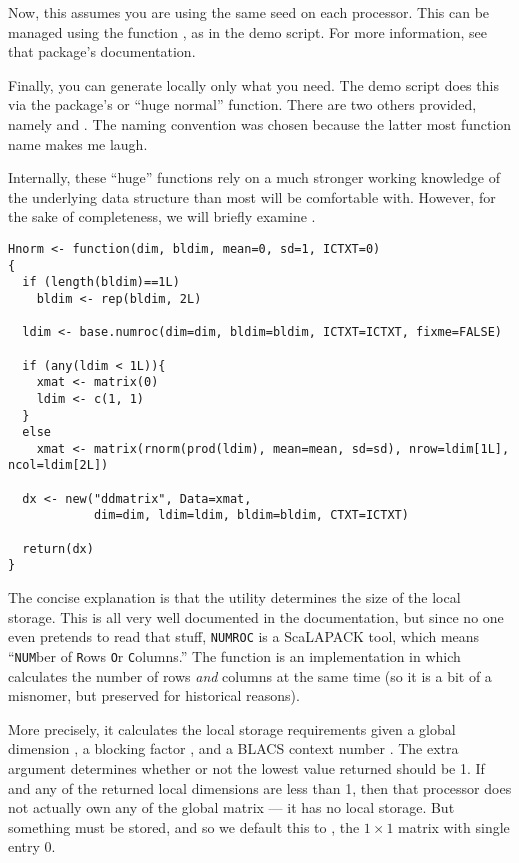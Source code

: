 Now, this assumes you are using the same seed on each processor.  This can be managed using the  function , as in the demo script.  For more information, see that package's documentation.

Finally, you can generate locally only what you need.  The demo script does this via the  package's  or ``huge normal'' function.  There are two others provided, namely  and .  The naming convention was chosen because the latter most function name makes me laugh.

Internally, these ``huge'' functions rely on a much stronger working knowledge of the underlying data structure than most will be comfortable with.  However, for the sake of completeness, we will briefly examine .

\begin{lstlisting}[language=rr,title=Hnorm()]
Hnorm <- function(dim, bldim, mean=0, sd=1, ICTXT=0)
{
  if (length(bldim)==1L)
    bldim <- rep(bldim, 2L)
  
  ldim <- base.numroc(dim=dim, bldim=bldim, ICTXT=ICTXT, fixme=FALSE)
    
  if (any(ldim < 1L)){
    xmat <- matrix(0)
    ldim <- c(1, 1)
  }
  else
    xmat <- matrix(rnorm(prod(ldim), mean=mean, sd=sd), nrow=ldim[1L], ncol=ldim[2L])
              
  dx <- new("ddmatrix", Data=xmat,
            dim=dim, ldim=ldim, bldim=bldim, CTXT=ICTXT)
            
  return(dx)
}
\end{lstlisting}

The concise explanation is that the  utility determines the size of the local storage.  This is all very well documented in the  documentation, but since no one even pretends to read that stuff, \texttt{NUMROC} is a ScaLAPACK tool, which means ``\texttt{NUM}ber of \texttt{R}ows \texttt{O}r \texttt{C}olumns.''  The function  is an implementation in  which calculates the number of rows \emph{and} columns at the same time (so it is a bit of a misnomer, but preserved for historical reasons).  

More precisely, it calculates the local storage requirements given a global dimension , a blocking factor , and a BLACS context number .  The extra argument  determines whether or not the lowest value returned should be 1.  If  and any of the returned local dimensions are less than 1, then that processor does not actually own any of the global matrix --- it has no local storage.  But something must be stored, and so we default this to , the $1\times 1$ matrix with single entry 0.


